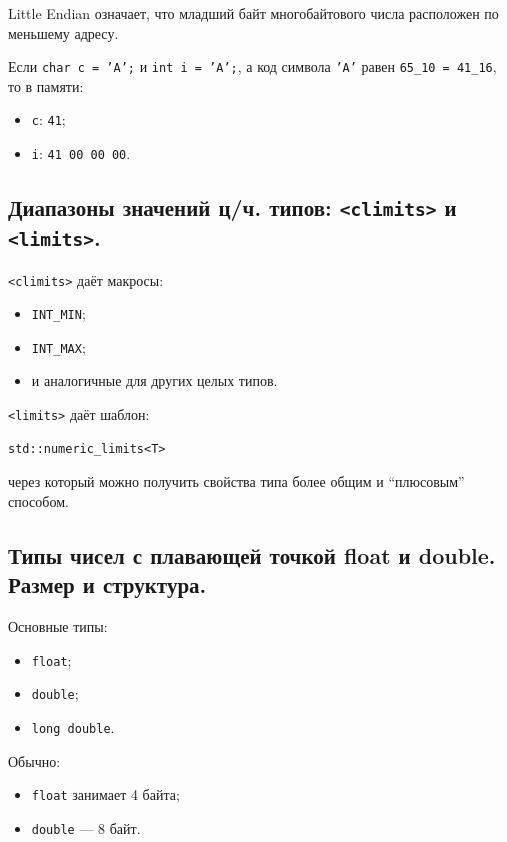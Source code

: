 Little Endian означает, что младший байт многобайтового числа расположен по меньшему адресу.

\begin{example}
Если \texttt{char c = 'A';} и \texttt{int i = 'A';}, а код символа \texttt{'A'} равен \texttt{65\_10 = 41\_16}, то в памяти:
\begin{itemize}
    \item \texttt{c}: \texttt{41};
    \item \texttt{i}: \texttt{41 00 00 00}.
\end{itemize}
\end{example}


\subsection{Диапазоны значений ц/ч. типов: \texttt{<climits>} и \texttt{<limits>}.}

\texttt{<climits>} даёт макросы:
\begin{itemize}
    \item \texttt{INT\_MIN};
    \item \texttt{INT\_MAX};
    \item и аналогичные для других целых типов.
\end{itemize}

\texttt{<limits>} даёт шаблон:
\begin{verbatim}
std::numeric_limits<T>
\end{verbatim}
через который можно получить свойства типа более общим и ``плюсовым'' способом.


\subsection{Типы чисел с плавающей точкой float и double. Размер и структура.}

Основные типы:
\begin{itemize}
    \item \texttt{float};
    \item \texttt{double};
    \item \texttt{long double}.
\end{itemize}

Обычно:
\begin{itemize}
    \item \texttt{float} занимает 4 байта;
    \item \texttt{double} --- 8 байт.
\end{itemize}

